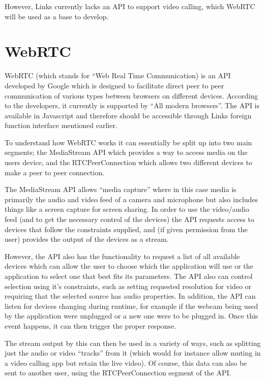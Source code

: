 \documentclass[bsc,frontabs,singlespacing,parskip,deptreport]{infthesis}
\begin{document}
However, Links currently lacks an API to support video calling, which WebRTC will be used as a base to develop.

\section{WebRTC}

WebRTC (which stands for “Web Real Time Communication) is an API developed by Google which is designed to facilitate direct peer to peer communication of various types between browsers on different devices.  According to the developers, it currently is supported by “All modern browsers”.  The API is available in Javascript and therefore should be accessible through Links foreign function interface mentioned earlier.

To understand how WebRTC works it can essentially be split up into two main segments; the MediaStream API which provides a way to access media on the users device, and the RTCPeerConnection which allows two different devices to make a peer to peer connection.

The MediaStream API allows “media capture” where in this case media is primarily the audio and video feed of a camera and microphone but also includes things like a screen capture for screen sharing.  In order to use the video/audio feed (and to get the necessary control of the devices) the API requests access to devices that follow the constraints supplied, and (if given permission from the user) provides the output of the devices as a stream.

However, the API also has the functionality to request a list of all available devices which can allow the user to choose which the application will use or the application to select one that best fits its parameters.  The API also can control selection using it’s constraints, such as setting requested resolution for video or requiring that the selected source has audio properties. In addition, the API can listen for devices changing during runtime, for example if the webcam being used by the application were unplugged or a new one were to be plugged in.  Once this event happens, it can then trigger the proper response.

The stream output by this can then be used in a variety of ways, such as splitting just the audio or video “tracks” from it (which would for instance allow muting in a video calling app but retain the live video).  Of course, this data can also be sent to another user, using the RTCPeerConnection segment of the API.
\end{document}
